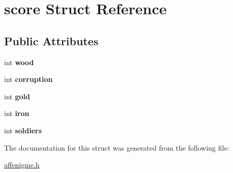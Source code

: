 \hypertarget{structscore}{\section{score Struct Reference}
\label{structscore}
}
\subsection*{Public Attributes}
\begin{DoxyCompactItemize}
\item 
\hypertarget{structscore_ab87a23358c5ea71894a136386a8970ce}{int {\bfseries wood}}\label{structscore_ab87a23358c5ea71894a136386a8970ce}

\item 
\hypertarget{structscore_a87f4590c1d220cd760bc47f64d5b9974}{int {\bfseries corruption}}\label{structscore_a87f4590c1d220cd760bc47f64d5b9974}

\item 
\hypertarget{structscore_a31bcd924df43320684730d900185d17e}{int {\bfseries gold}}\label{structscore_a31bcd924df43320684730d900185d17e}

\item 
\hypertarget{structscore_af429ea0d77cd94012912ef23f684a852}{int {\bfseries iron}}\label{structscore_af429ea0d77cd94012912ef23f684a852}

\item 
\hypertarget{structscore_aef5852b0322324b046b810daaa177a44}{int {\bfseries soldiers}}\label{structscore_aef5852b0322324b046b810daaa177a44}

\end{DoxyCompactItemize}


The documentation for this struct was generated from the following file\-:\begin{DoxyCompactItemize}
\item 
\hyperlink{affenigme_8h}{affenigme.\-h}\end{DoxyCompactItemize}
